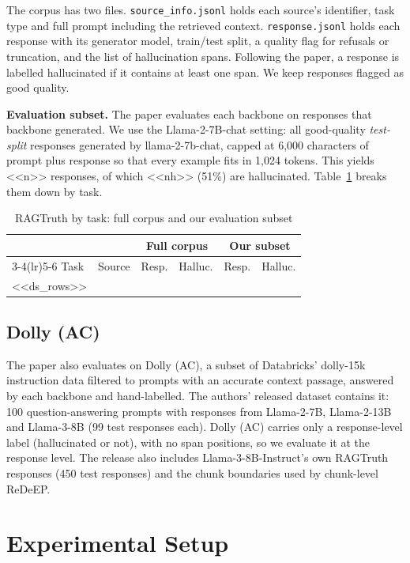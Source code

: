 \documentclass[conference]{IEEEtran}
\begin{document}
The corpus has two files. \texttt{source\_info.jsonl} holds each source's identifier, task type and full prompt including the retrieved context. \texttt{response.jsonl} holds each response with its generator model, train/test split, a quality flag for refusals or truncation, and the list of hallucination spans. Following the paper, a response is labelled hallucinated if it contains at least one span. We keep responses flagged as good quality.

\textbf{Evaluation subset.} The paper evaluates each backbone on responses that backbone generated. We use the Llama-2-7B-chat setting: all good-quality \emph{test-split} responses generated by llama-2-7b-chat, capped at 6{,}000 characters of prompt plus response so that every example fits in 1{,}024 tokens. This yields <<n>> responses, of which <<nh>> (51\%) are hallucinated. Table~\ref{tab:data} breaks them down by task.

\begin{table}[t]
\caption{RAGTruth by task: full corpus and our evaluation subset}
\label{tab:data}
\centering\footnotesize
\setlength{\tabcolsep}{3pt}
\begin{tabular}{@{}llrrrr@{}}
\toprule
& & \multicolumn{2}{c}{Full corpus} & \multicolumn{2}{c}{Our subset} \\
\cmidrule(lr){3-4}\cmidrule(lr){5-6}
Task & Source & Resp. & Halluc. & Resp. & Halluc. \\
\midrule
<<ds_rows>>
\bottomrule
\end{tabular}
\end{table}

\subsection{Dolly (AC)}
The paper also evaluates on Dolly (AC), a subset of Databricks' dolly-15k instruction data filtered to prompts with an accurate context passage, answered by each backbone and hand-labelled. The authors' released dataset contains it: 100 question-answering prompts with responses from Llama-2-7B, Llama-2-13B and Llama-3-8B (99 test responses each). Dolly (AC) carries only a response-level label (hallucinated or not), with no span positions, so we evaluate it at the response level. The release also includes Llama-3-8B-Instruct's own RAGTruth responses (450 test responses) and the chunk boundaries used by chunk-level ReDeEP.

\section{Experimental Setup}
\end{document}
